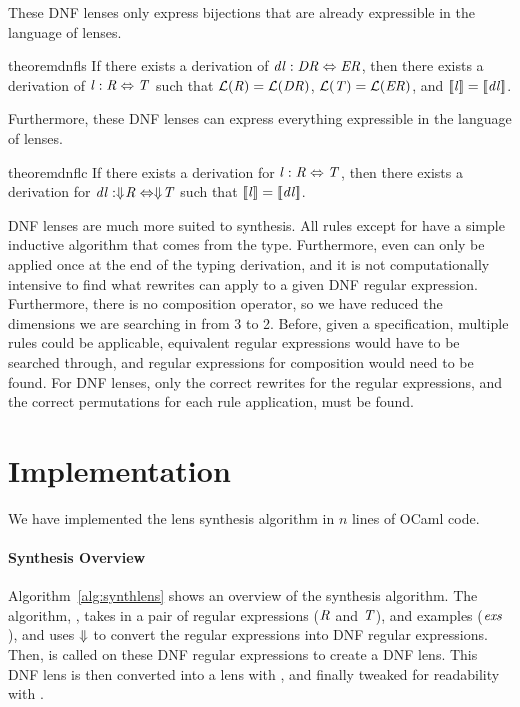 \documentclass[numbers,10pt,preprint\ifanon ,nocopyrightspace\fi]{sigplanconf}
\begin{document}
These DNF lenses only express bijections that are already expressible in the language of lenses.
\begin{restatable}{theorem}{dnfls}
  \label{thm:dnfls}
  If there exists a derivation of $\mathit{dl} : \mathit{DR} \Leftrightarrow \mathit{ER}$,
  then there exists a derivation of $\mathit{l} : \mathit{R} \Leftrightarrow \mathit{T}$ such that
  $\mathcal{L}(\mathit{R})=\mathcal{L}(\mathit{DR})$,
  $\mathcal{L}(\mathit{T})=\mathcal{L}(\mathit{ER})$, and
  $[ \! [\mathit{l}] \! ]=[ \! [\mathit{dl}] \! ]$.
\end{restatable}

Furthermore, these DNF lenses can express everything
expressible in the language of lenses.

\begin{restatable}{theorem}{dnflc}
  \label{thm:dnflc}
  If there exists a derivation for $\mathit{l} : \mathit{R} \Leftrightarrow
  \mathit{T}$,
  then there exists a derivation for
  $\mathit{dl} : \Downarrow\mkern-4mu \mathit{R} \Leftrightarrow \Downarrow\mkern-4mu \mathit{T}$
  such that $[ \! [\mathit{l}] \! ]=[ \! [\mathit{dl}] \! ]$.
\end{restatable}

DNF lenses are much more suited to synthesis.
All rules except for \RewriteDNFRegexLensRule{} have a simple inductive
algorithm that comes from the type.  Furthermore, even
\RewriteDNFRegexLensRule{} can only be applied once at the end of the typing
derivation, and it is not computationally intensive to find what rewrites can
apply to a given DNF regular expression.
Furthermore, there is no composition operator, so
we have reduced the dimensions we are searching in from 3 to 2.  Before, given a
specification, multiple rules could be applicable, equivalent regular
expressions would have to be searched through, and regular expressions for
composition would need to be found.
For DNF lenses, only the correct rewrites for the regular expressions, and the
correct permutations for each rule application, must be found.

\section{Implementation}
\label{implementation}
We have implemented the lens synthesis algorithm in $n$ lines of OCaml code.

\paragraph*{Synthesis Overview}
Algorithm~\ref{alg:synthlens} shows an overview of the synthesis
algorithm.  The algorithm, \SynthLens{}, takes in a pair of
regular expressions ($\mathit{R}$ and $\mathit{T}$), and examples ($\mathit{exs}$),
and uses $\Downarrow$ to convert the
regular expressions into DNF regular expressions.
Then, \SynthDNFLens{} is called on these DNF regular expressions to create a
DNF lens.
This DNF lens is then converted into a lens with \ToLens{}, and finally
tweaked for readability with \Beautify{}.
\end{document}
